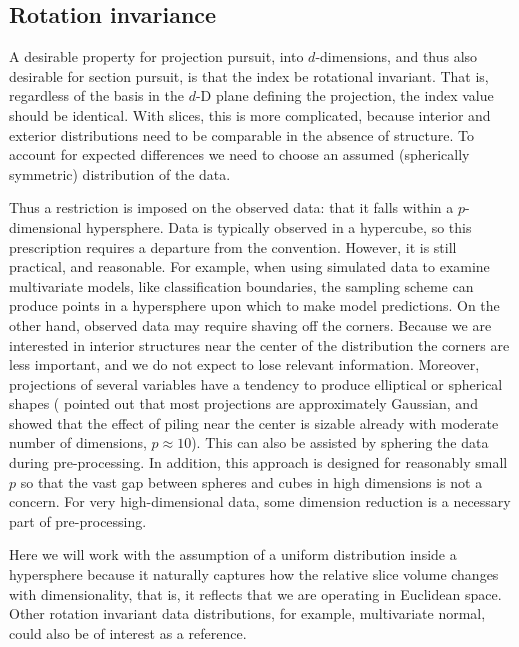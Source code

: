 \documentclass[]{interact}
\theoremstyle{plain}%
\theoremstyle{definition}
\theoremstyle{remark}
\begin{document}
\hypertarget{rotation-invariance}{%
\subsection{\texorpdfstring{Rotation invariance
\label{sec:rotinv}}{Rotation invariance }}\label{rotation-invariance}}

A desirable property for projection pursuit, into \(d\)-dimensions, and
thus also desirable for section pursuit, is that the index be rotational
invariant. That is, regardless of the basis in the \(d\)-D plane
defining the projection, the index value should be identical. With
slices, this is more complicated, because interior and exterior
distributions need to be comparable in the absence of structure. To
account for expected differences we need to choose an assumed
(spherically symmetric) distribution of the data.

Thus a restriction is imposed on the observed data: that it falls within
a \(p\)-dimensional hypersphere. Data is typically observed in a
hypercube, so this prescription requires a departure from the
convention. However, it is still practical, and reasonable. For example,
when using simulated data to examine multivariate models, like
classification boundaries, the sampling scheme can produce points in a
hypersphere upon which to make model predictions. On the other hand,
observed data may require shaving off the corners. Because we are
interested in interior structures near the center of the distribution
the corners are less important, and we do not expect to lose relevant
information. Moreover, projections of several variables have a tendency
to produce elliptical or spherical shapes (\citet{diaconis1984} pointed
out that most projections are approximately Gaussian, and
\citet{burningsage} showed that the effect of piling near the center is
sizable already with moderate number of dimensions, \(p\approx10\)).
This can also be assisted by sphering the data during pre-processing. In
addition, this approach is designed for reasonably small \(p\) so that
the vast gap between spheres and cubes in high dimensions is not a
concern. For very high-dimensional data, some dimension reduction is a
necessary part of pre-processing.

Here we will work with the assumption of a uniform distribution inside a
hypersphere because it naturally captures how the relative slice volume
changes with dimensionality, that is, it reflects that we are operating
in Euclidean space. Other rotation invariant data distributions, for
example, multivariate normal, could also be of interest as a reference.
\end{document}
